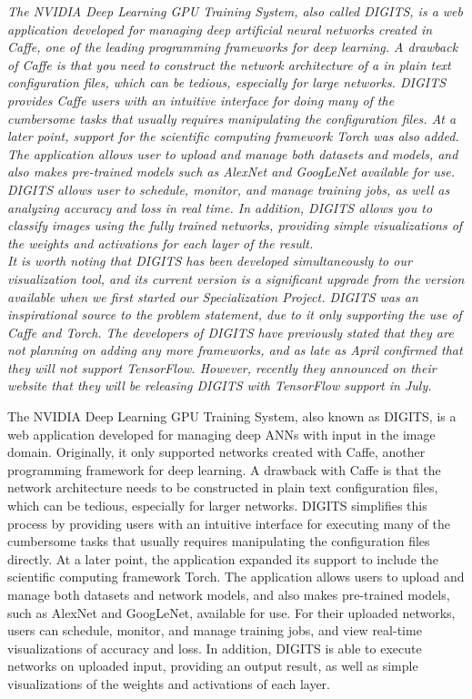 \textit{The NVIDIA Deep Learning GPU Training System, also called DIGITS, is a web application developed for managing deep artificial neural networks created in Caffe, one of the leading programming frameworks for deep learning. A drawback of Caffe is that you need to construct the network architecture of a in plain text configuration files, which can be tedious, especially for large networks. DIGITS provides Caffe users with an intuitive interface for doing many of the cumbersome tasks that usually requires manipulating the configuration files. At a later point, support for the scientific computing framework Torch was also added. The application allows user to upload and manage both datasets and models, and also makes pre-trained models such as AlexNet and GoogLeNet available for use. DIGITS allows user to schedule, monitor, and manage training jobs, as well as analyzing accuracy and loss in real time. In addition, DIGITS allows you to classify images using the fully trained networks, providing simple visualizations of the weights and activations for each layer of the result.} \\

\noindent \textit{It is worth noting that DIGITS has been developed simultaneously to our visualization tool, and its current version is a significant upgrade from the version available when we first started our Specialization Project. DIGITS was an inspirational source to the problem statement, due to it only supporting the use of Caffe and Torch. The developers of DIGITS have previously stated that they are not planning on adding any more frameworks, and as late as April confirmed that they will not support TensorFlow. However, recently they announced on their website that they will be releasing DIGITS with TensorFlow support in July.}

The NVIDIA Deep Learning GPU Training System, also known as DIGITS, is a web application developed for managing deep ANNs with input in the image domain. Originally, it only supported networks created with Caffe, another programming framework for deep learning. A drawback with Caffe is that the network architecture needs to be constructed in plain text configuration files, which can be tedious, especially for larger networks. DIGITS simplifies this process by providing users with an intuitive interface for executing many of the cumbersome tasks that usually requires manipulating the configuration files directly. At a later point, the application expanded its support to include the scientific computing framework Torch. The application allows users to upload and manage both datasets and network models, and also makes pre-trained models, such as AlexNet and GoogLeNet, available for use. For their uploaded networks, users can schedule, monitor, and manage training jobs, and view real-time visualizations of accuracy and loss. In addition, DIGITS is able to execute networks on uploaded input, providing an output result, as well as simple visualizations of the weights and activations of each layer. \\

